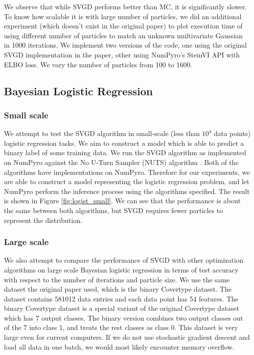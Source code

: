 

We observe that while SVGD performs better than MC, it is significantly slower. To know how scalable it is with large number of particles, we did an additional experiment (which doesn't exist in the original paper) to plot execution time of using different number of particles to match an unknown multivariate Gaussian in 1000 iterations. We implement two versions of the code, one using the original SVGD implementation in the paper, other using NumPyro's SteinVI API with ELBO loss. We vary the number of particles from 100 to 1600. 



\subsection{Bayesian Logistic Regression}
\subsubsection{Small scale}
We attempt to test the SVGD algorithm in small-scale (less than $10^4$ data points) logistic regression tasks. We aim to construct a model which is able to predict a binary label of some training data. We run the SVGD algorithm as implemented on NumPyro against the No U-Turn Sampler (NUTS) algorithm \cite{nuts}. Both of the algorithms have implementations on NumPyro. Therefore for our experiments, we are able to construct a model representing the logistic regression problem, and let NumPyro perform the inference process using the algorithms specified. The result is shown in Figure \ref{fig:logist_small}. We can see that the performance is about the same between both algorithms, but SVGD requires fewer particles to represent the distribution. 



\subsubsection{Large scale}
We also attempt to compare the performance of SVGD with other optimization algorithms on large scale Bayesian logistic regression in terms of test accuracy with respect to the number of iterations and particle size. We use the same dataset the original paper used, which is the binary Covertype dataset. The dataset contains 581012 data entries and each data point has 54 features. The binary Covertype dataset is a special variant of the original Covertype dataset which has 7 output classes. The binary version combines two output classes out of the 7 into class 1, and treats the rest classes as class 0. This dataset is very large even for current computers. If we do not use stochastic gradient descent and load all data in one batch, we would most likely encounter memory overflow. 

